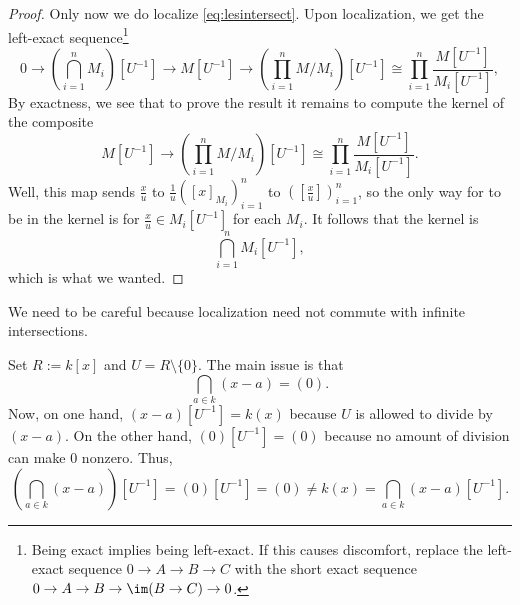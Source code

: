 \begin{proof}
	Only now we do localize \autoref{eq:lesintersect}. Upon localization, we get the left-exact sequence\footnote{Being exact implies being left-exact. If this causes discomfort, replace the left-exact sequence $0\to A\to B\to C$ with the short exact sequence $0\to A\to B\to\im(B\to C)\to0$.}
	\[0\to\left(\bigcap_{i=1}^nM_i\right)\left[U^{-1}\right]\to M\left[U^{-1}\right]\to\left(\prod_{i=1}^nM/M_i\right)\left[U^{-1}\right]\cong\prod_{i=1}^n\frac{M\left[U^{-1}\right]}{M_i\left[U^{-1}\right]},\]
	By exactness, we see that to prove the result it remains to compute the kernel of the composite
	\[M\left[U^{-1}\right]\to\left(\prod_{i=1}^nM/M_i\right)\left[U^{-1}\right]\cong\prod_{i=1}^n\frac{M\left[U^{-1}\right]}{M_i\left[U^{-1}\right]}.\]
	Well, this map sends $\frac xu$ to $\frac1u([x]_{M_i})_{i=1}^n$ to $\left([\frac xu]\right)_{i=1}^n$, so the only way for to be in the kernel is for $\frac xu\in M_i\left[U^{-1}\right]$ for each $M_i$. It follows that the kernel is
	\[\bigcap_{i=1}^nM_i\left[U^{-1}\right],\]
	which is what we wanted.
\end{proof}
We need to be careful because localization need not commute with infinite intersections.
\begin{example}
	Set $R:=k[x]$ and $U=R\setminus\{0\}$. The main issue is that
	\[\bigcap_{a\in k}(x-a)=(0).\]
	Now, on one hand, $(x-a)\left[U^{-1}\right]=k(x)$ because $U$ is allowed to divide by $(x-a)$. On the other hand, $(0)\left[U^{-1}\right]=(0)$ because no amount of division can make $0$ nonzero. Thus,
	\[\left(\bigcap_{a\in k}(x-a)\right)\left[U^{-1}\right]=(0)\left[U^{-1}\right]=(0)\ne k(x)=\bigcap_{a\in k}(x-a)\left[U^{-1}\right].\]
\end{example}

